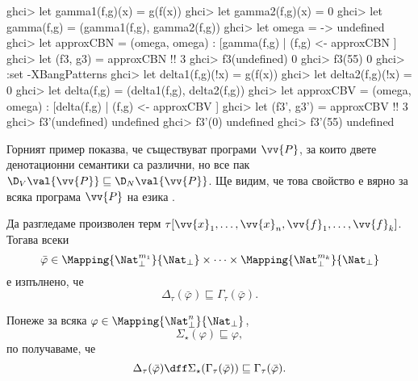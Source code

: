 \begin{haskellcode}
ghci> let gamma1(f,g)(x) = g(f(x))
ghci> let gamma2(f,g)(x) = 0
ghci> let gamma(f,g) = (gamma1(f,g), gamma2(f,g))
ghci> let omega = \x -> undefined
ghci> let approxCBN = (omega, omega) : [gamma(f,g) | (f,g) <- approxCBN ]
ghci> let (f3, g3) = approxCBN !! 3
ghci> f3(undefined)
0
ghci> f3(55)
0
ghci> :set -XBangPatterns
ghci> let delta1(f,g)(!x) = g(f(x))
ghci> let delta2(f,g)(!x) = 0
ghci> let delta(f,g) = (delta1(f,g), delta2(f,g))
ghci> let approxCBV = (omega, omega) : [delta(f,g) | (f,g) <- approxCBV ]
ghci> let (f3', g3') = approxCBV !! 3
ghci> f3'(undefined)
undefined
ghci> f3'(0)
undefined
ghci> f3'(55)
undefined
\end{haskellcode}



  Горният пример показва, че съществуват програми $\vv{P}$, 
  за които двете денотационни семантики са различни, но все пак $\D_V\val{\vv{P}} \sqsubseteq \D_N\val{\vv{P}}$.
  Ще видим, че това свойство е вярно за всяка програма $\vv{P}$ на езика \REC.


  \begin{proposition}
    \label{pr:delta-in-gamma}
    Да разгледаме произволен терм $\tau[\vv{x}_1,\dots,\vv{x}_n, \vv{f}_1,\dots,\vv{f}_k]$.
    Тогава всеки 
    \[\bar{\varphi} \in \Mapping{\Nat^{m_1}_\bot}{\Nat_\bot}\times\cdots\times\Mapping{\Nat^{m_k}_\bot}{\Nat_\bot}\]
    е изпълнено, че
    \[\Delta_\tau(\bar{\varphi}) \sqsubseteq \Gamma_\tau(\bar{\varphi}).\]
  \end{proposition}
  \begin{hint}
    Понеже за всяка $\varphi \in \Mapping{\Nat^n_\bot}{\Nat_\bot}$,
    \[\Sigma_\star(\varphi) \sqsubseteq \varphi,\]
    по получаваме, че
    \[\Delta_\tau(\bar{\varphi}) \dff \Sigma_\star(\Gamma_\tau(\bar{\varphi})) \sqsubseteq \Gamma_\tau(\bar{\varphi}).\]
\end{hint}

